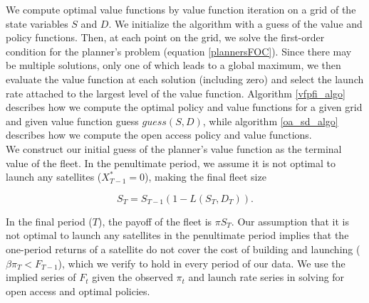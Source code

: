 \documentclass[9pt,twoside,lineno]{pnas-new}
\begin{document}
We compute optimal value functions by value function iteration on a grid of the state variables $S$ and $D$. We initialize the algorithm with a guess of the value and policy functions. Then, at each point on the grid, we solve the first-order condition for the planner's problem (equation \ref{plannersFOC}). Since there may be multiple solutions, only one of which leads to a global maximum, we then evaluate the value function at each solution (including zero) and select the launch rate attached to the largest level of the value function. Algorithm \ref{vfpfi_algo} describes how we compute the optimal policy and value functions for a given grid and given value function guess $guess(S,D)$, while algorithm \ref{oa_sd_algo} describes how we compute the open access policy and value functions. \\

We construct our initial guess of the planner's value function as the terminal value of the fleet. In the penultimate period, we assume it is not optimal to launch any satellites ($X^*_{T-1} = 0$), making the final fleet size 

\[ S_T = S_{T-1}(1-L(S_T,D_T)) .\]

In the final period ($T$), the payoff of the fleet is $\pi S_T$. Our assumption that it is not optimal to launch any satellites in the penultimate period implies that the one-period returns of a satellite do not cover the cost of building and launching ($\beta \pi_T < F_{T-1}$), which we verify to hold in every period of our data. We use the implied series of $F_t$ given the observed $\pi_t$ and launch rate series in solving for open access and optimal policies.

\end{document}
